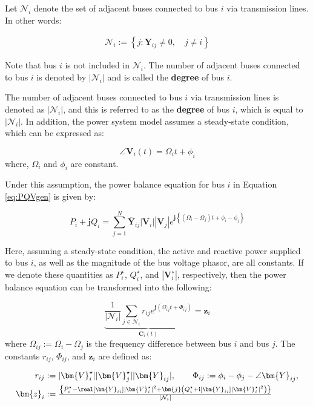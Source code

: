 \documentclass[graybox, envcountchap]{svmult}
\begin{document}
Let $\mathcal{N}_i$ denote the set of adjacent buses connected to bus $i$ via
transmission lines. In other words:

\begin{align*}
  \mathcal{N}_i:=
  \left\{
    j : \bm{Y}_{ij} \neq 0,\quad j \neq i
  \right\}
\end{align*}

Note that bus $i$ is not included in $\mathcal{N}_i$. The number of adjacent
buses connected to bus $i$ is denoted by $|\mathcal{N}_i|$ and is called the
\textbf{degree} of bus $i$.

The number of adjacent buses connected to bus $i$ via transmission lines is
denoted as $|\mathcal{N}_i|$, and this is referred to as the
\textbf{degree} of bus $i$, which is equal to $|\mathcal{N}_i|$.
In addition, the power system model assumes a steady-state condition, which can
be expressed as:

\begin{equation*}
  \angle \bm{V}_i (t) = \Omega_i t +\phi_i
\end{equation*}
where, $\Omega_i$ and $\phi_i$ are constant. 

Under this assumption, the power balance equation for bus $i$ in Equation
\ref{eq:PQVgen} is given by:

\[
  P_i + \bm{j} Q_i = \sum_{j=1}^N \overline{\bm{Y}}_{ij} |\bm{V}_i| |\bm{V}_j|
  e^{\bm{j} \left\{ ( \Omega_i - \Omega_j )t + \phi_i -\phi_j \right\}}
\]

Here, assuming a steady-state condition, the active and reactive power supplied
to bus $i$, as well as the magnitude of the bus voltage phasor, are all
constants. If we denote these quantities as $P_i^{\star}$, $Q_i^{\star}$, and
$|\bm{V}_i^{\star}|$, respectively, then the power balance equation can be
transformed into the following: 

\begin{equation}\label{eq:sumcirc}
  \underbrace{
    \frac{1}{|\mathcal{N}_i|}\sum_{j \in \mathcal{N}_i } 
    r_{ij}
    e^{\bm{j} 
    \left(
    \Omega_{ij}t + 
    \Phi_{ij}
    \right) }
  }_{\bm{C}_i (t)}
  = \bm{z}_i
\end{equation}
where $\Omega_{ij}:=\Omega_{i}-\Omega_{j}$ is the frequency difference between bus
$i$ and bus $j$. The constants $r_{ij}$, $\Phi_{ij}$, and $\bm{z}_i$ are defined
as:

\begin{align*}
  r_{ij} &:=|\bm{V}_i^{\star}| |\bm{V}_j^{\star}| |\bm{Y}_{ij}|, \qquad
  \Phi_{ij} := \phi_i - \phi_j - \angle \bm{Y}_{ij},
  \\
  \bm{z}_i &:=  \tfrac{
  \left\{
  P_i^{\star} - \real[\bm{Y}_{ii}] |\bm{V}_i^{\star}|^2
  + \bm{j}
  \left(
  Q_i^{\star} + \imag [\bm{Y}_{ii}] |\bm{V}_i^{\star}|^2
  \right)
  \right\}
  }
  {|\mathcal{N}_i|}
\end{align*}
\end{document}
